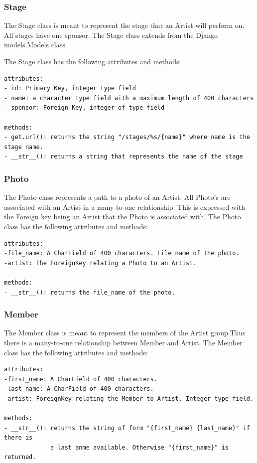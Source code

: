 \documentclass[12pt,english]{scrartcl}
\begin{document}
\subsubsection{Stage}
The Stage class is meant to represent the stage that an Artist will perform on. All stages
have one sponsor. The Stage class extends from the Django models.Models class.

The Stage class has the following attributes and methods:
\begin{verbatim}
attributes:
- id: Primary Key, integer type field
- name: a character type field with a maximum length of 400 characters
- sponsor: Foreign Key, integer of type field

methods:
- get.url(): returns the string "/stages/%s/{name}" where name is the stage name.
- __str__(): returns a string that represents the name of the stage
\end{verbatim}

\subsubsection{Photo}
The Photo class represents a path to a photo of an Artist. 
All Photo's are associated with an Artist in a many-to-one relationship.
This is expressed with the Foreign key being an Artist that the Photo is associated with. 
The Photo class has the following attributes and methods:
\begin{verbatim}
attributes:
-file_name: A CharField of 400 characters. File name of the photo. 
-artist: The ForeignKey relating a Photo to an Artist.

methods:
- __str__(): returns the file_name of the photo.
\end{verbatim}

\subsubsection{Member}
The Member class is meant to represent the members of the Artist group.Thus there is a many-to-one relationship between Member and Artist.
The Member class has the following attributes and methods:
\begin{verbatim}
attributes:
-first_name: A CharField of 400 characters. 
-last_name: A CharField of 400 characters.
-artist: ForeignKey relating the Member to Artist. Integer type field.

methods:
- __str__(): returns the string of form "{first_name} {last_name}" if there is
             a last anme available. Otherwise "{first_name}" is returned.
\end{verbatim}
\end{document}
